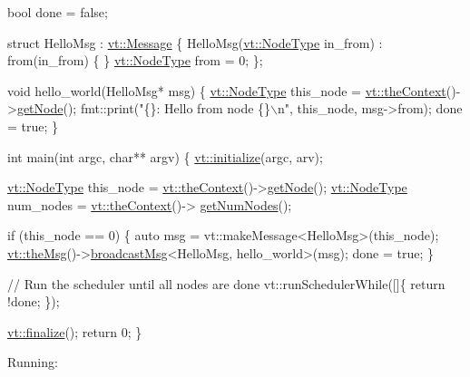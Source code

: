 \begin{DoxyCode}
\textcolor{keywordtype}{bool} done = \textcolor{keyword}{false};

\textcolor{keyword}{struct }HelloMsg : \hyperlink{structvt_1_1messaging_1_1_active_msg}{vt::Message} \{
  HelloMsg(\hyperlink{namespacevt_a866da9d0efc19c0a1ce79e9e492f47e2}{vt::NodeType} in\_from) : from(in\_from) \{ \}
  \hyperlink{namespacevt_a866da9d0efc19c0a1ce79e9e492f47e2}{vt::NodeType} from = 0;
\};

\textcolor{keywordtype}{void} hello\_world(HelloMsg* msg) \{
  \hyperlink{namespacevt_a866da9d0efc19c0a1ce79e9e492f47e2}{vt::NodeType} this\_node = \hyperlink{namespacevt_a26551fe0e6e6a1371111df5b12c7e92c}{vt::theContext}()->\hyperlink{structvt_1_1ctx_1_1_context_a0d52c263ce8516546a67443d9a86fa5f}{getNode}();
  fmt::print(\textcolor{stringliteral}{"\{\}: Hello from node \{\}\(\backslash\)n"}, this\_node, msg->from);
  done = \textcolor{keyword}{true};
\}

\textcolor{keywordtype}{int} main(\textcolor{keywordtype}{int} argc, \textcolor{keywordtype}{char}** argv) \{
  \hyperlink{namespacevt_aae6ab5af3e11886ce73c4c3ffa008201}{vt::initialize}(argc, arv);

  \hyperlink{namespacevt_a866da9d0efc19c0a1ce79e9e492f47e2}{vt::NodeType} this\_node = \hyperlink{namespacevt_a26551fe0e6e6a1371111df5b12c7e92c}{vt::theContext}()->\hyperlink{structvt_1_1ctx_1_1_context_a0d52c263ce8516546a67443d9a86fa5f}{getNode}();
  \hyperlink{namespacevt_a866da9d0efc19c0a1ce79e9e492f47e2}{vt::NodeType} num\_nodes = \hyperlink{namespacevt_a26551fe0e6e6a1371111df5b12c7e92c}{vt::theContext}()->
      \hyperlink{structvt_1_1ctx_1_1_context_a7f41071aadf6d5fa9e1b6c703c5ff19d}{getNumNodes}();

  \textcolor{keywordflow}{if} (this\_node == 0) \{
    \textcolor{keyword}{auto} msg = vt::makeMessage<HelloMsg>(this\_node);
    \hyperlink{namespacevt_aeafd31f866aeb4dc6fc2f6ee97136350}{vt::theMsg}()->\hyperlink{group__typesafehan_ga1a347aac6b6b8d47c9b1c8cc11b7f33e}{broadcastMsg}<HelloMsg, hello\_world>(msg);
    done = \textcolor{keyword}{true};
  \}

  \textcolor{comment}{// Run the scheduler until all nodes are done}
  vt::runSchedulerWhile([]\{ \textcolor{keywordflow}{return} !done; \});

  \hyperlink{namespacevt_a540d90dbd6e97b69f1dcbc9ee9314cff}{vt::finalize}();
  \textcolor{keywordflow}{return} 0;
\}
\end{DoxyCode}


Running\+:


